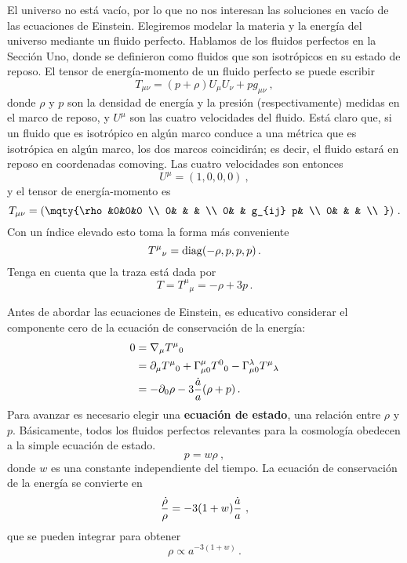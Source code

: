 \documentclass[11pt,b5paper,openany,twoside]{book}
\newcommand{\mn}{{\mu\nu}}
\newcommand{\p}[1]{{\partial_{#1}}}
\begin{document}
El universo no está vacío, por lo que no nos interesan las soluciones en vacío de las ecuaciones de Einstein.
Elegiremos modelar la materia y la energía del universo mediante un fluido perfecto.
Hablamos de los fluidos perfectos en la Sección Uno, donde se definieron como fluidos que son isotrópicos en su estado de reposo.
El tensor de energía-momento de un fluido perfecto se puede escribir
\begin{equation}
T_{\mn} = (p+\rho)U_\mu U_\nu + pg_\mn\ ,\label{8.15}
\end{equation}
donde $\rho$ y $p$ son la densidad de energía y la presión (respectivamente) medidas en el marco de reposo, y $U^\mu$ son las cuatro velocidades del fluido.
Está claro que, si un fluido que es isotrópico en algún marco conduce a una métrica que es isotrópica en algún marco, los dos marcos coincidirán; es decir, el fluido estará en reposo en coordenadas comoving.
Las cuatro velocidades son entonces
\begin{equation}
U^\mu = (1,0,0,0)\ ,\label{8.16}
\end{equation}
y el tensor de energía-momento es
\begin{equation}
T_\mn = \left(\mqty{\rho &0&0&0 \\  0& & &  \\
0& & g_{ij} p&  \\  0& & &  \\ }\right)\,.\label{8.17}
\end{equation}
Con un índice elevado esto toma la forma más conveniente
\begin{equation}
T^\mu{}_\nu = {\rm diag}(-\rho,p,p,p)\,.\label{8.18}
\end{equation}
Tenga en cuenta que la traza está dada por
\begin{equation}
T = T^\mu{}_\mu = -\rho +3p\,.\label{8.19}
\end{equation}

Antes de abordar las ecuaciones de Einstein, es educativo considerar el componente cero de la ecuación de conservación de la energía:
\begin{align}
0  &=  \nabla_\mu T^\mu{}_0 \notag \\
&=  \p\mu T^\mu{}_0 +\Gamma^\mu_{\mu 0}T^0{}_0
-\Gamma^\lambda_{\mu 0}T^\mu{}_\lambda \notag \\
&=  -\p0\rho -3{{\dot a}\over a}(\rho+p)\,.
\label{8.20}
\end{align}
Para avanzar es necesario elegir una {\bf ecuación de estado}, una relación entre $\rho$ y $p$.
Básicamente, todos los fluidos perfectos relevantes para la cosmología obedecen a la simple ecuación de estado.
\begin{equation}
p=w\rho\ ,\label{8.21}
\end{equation}
donde $w$ es una constante independiente del tiempo.
La ecuación de conservación de la energía se convierte en
\begin{equation}
{{\dot \rho}\over\rho} = -3(1+w){{\dot a}\over{a}}\ ,\label{8.22}
\end{equation}
que se pueden integrar para obtener
\begin{equation}
\rho \propto a^{-3(1+w)}\,.\label{8.23}
\end{equation}
\end{document}
